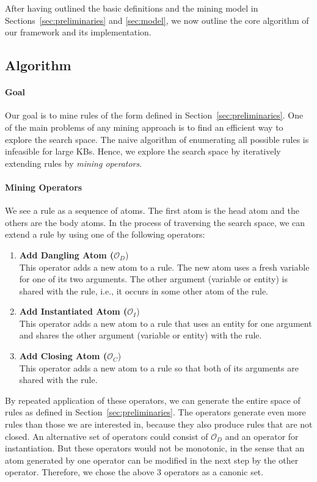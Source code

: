 
After having outlined the basic definitions and the mining model in Sections~\ref{sec:preliminaries} and \ref{sec:model}, we now outline the core algorithm of our framework and its implementation. 

\subsection{Algorithm}
\paragraph{Goal} Our goal is to mine rules of the form defined in Section~\ref{sec:preliminaries}.
One of the main problems of any mining approach is to find an efficient way to explore the search space. The naive algorithm of enumerating all possible rules is infeasible for large KBs.
Hence, we explore the search space by iteratively extending rules by \emph{mining operators}.

\paragraph{Mining Operators} 
We see a rule as a sequence of atoms. The first atom is the head atom and the others are the body atoms. In the process of traversing the search space, we can extend a rule by using one of the following operators:
\begin{enumerate}
\item \textbf{Add Dangling Atom ($\mathcal{O}_D$})\\
This operator adds a new atom to a rule. The new atom uses a fresh variable for one of its two arguments. The other argument (variable or entity) is shared with the rule, i.e., it occurs in some other atom of the rule. 
\item \textbf{Add Instantiated Atom ($\mathcal{O}_I$})\\
This operator adds a new atom to a rule that uses an entity for one argument and shares the other argument (variable or entity) with the rule. 
\item \textbf{Add Closing Atom ($\mathcal{O}_C$})\\
This operator adds a new atom to a rule so that both of its arguments are shared with the rule. 
\end{enumerate}
By repeated application of these operators, we can generate the entire space of rules as defined in Section~\ref{sec:preliminaries}. The operators generate even more rules than those we are interested in, because they also produce rules that are not closed. An alternative set of operators could consist of $\mathcal{O}_D$ and an operator for instantiation. But these operators would not be monotonic, in the sense that an atom generated by one operator can be modified in the next step by the other operator. Therefore, we chose the above 3 operators as a canonic set. 

